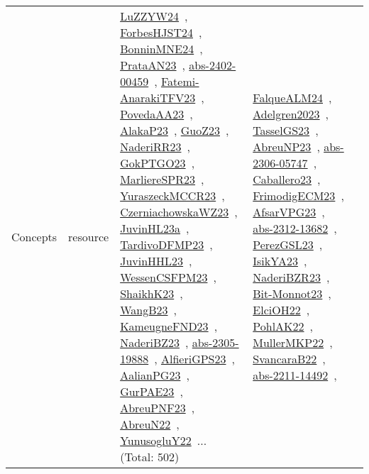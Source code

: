{\begin{longtable}{lp{3cm}>{\raggedright\arraybackslash}p{6cm}>{\raggedright\arraybackslash}p{6cm}>{\raggedright\arraybackslash}p{8cm}}
\index{resource}\index{Concepts!resource}Concepts & resource & \href{../works/LuZZYW24.pdf}{LuZZYW24}~\cite{LuZZYW24}, \href{../works/ForbesHJST24.pdf}{ForbesHJST24}~\cite{ForbesHJST24}, \href{../works/BonninMNE24.pdf}{BonninMNE24}~\cite{BonninMNE24}, \href{../works/PrataAN23.pdf}{PrataAN23}~\cite{PrataAN23}, \href{../works/abs-2402-00459.pdf}{abs-2402-00459}~\cite{abs-2402-00459}, \href{../works/Fatemi-AnarakiTFV23.pdf}{Fatemi-AnarakiTFV23}~\cite{Fatemi-AnarakiTFV23}, \href{../works/PovedaAA23.pdf}{PovedaAA23}~\cite{PovedaAA23}, \href{../works/AlakaP23.pdf}{AlakaP23}~\cite{AlakaP23}, \href{../works/GuoZ23.pdf}{GuoZ23}~\cite{GuoZ23}, \href{../works/NaderiRR23.pdf}{NaderiRR23}~\cite{NaderiRR23}, \href{../works/GokPTGO23.pdf}{GokPTGO23}~\cite{GokPTGO23}, \href{../works/MarliereSPR23.pdf}{MarliereSPR23}~\cite{MarliereSPR23}, \href{../works/YuraszeckMCCR23.pdf}{YuraszeckMCCR23}~\cite{YuraszeckMCCR23}, \href{../works/CzerniachowskaWZ23.pdf}{CzerniachowskaWZ23}~\cite{CzerniachowskaWZ23}, \href{../works/JuvinHL23a.pdf}{JuvinHL23a}~\cite{JuvinHL23a}, \href{../works/TardivoDFMP23.pdf}{TardivoDFMP23}~\cite{TardivoDFMP23}, \href{../works/JuvinHHL23.pdf}{JuvinHHL23}~\cite{JuvinHHL23}, \href{../works/WessenCSFPM23.pdf}{WessenCSFPM23}~\cite{WessenCSFPM23}, \href{../works/ShaikhK23.pdf}{ShaikhK23}~\cite{ShaikhK23}, \href{../works/WangB23.pdf}{WangB23}~\cite{WangB23}, \href{../works/KameugneFND23.pdf}{KameugneFND23}~\cite{KameugneFND23}, \href{../works/NaderiBZ23.pdf}{NaderiBZ23}~\cite{NaderiBZ23}, \href{../works/abs-2305-19888.pdf}{abs-2305-19888}~\cite{abs-2305-19888}, \href{../works/AlfieriGPS23.pdf}{AlfieriGPS23}~\cite{AlfieriGPS23}, \href{../works/AalianPG23.pdf}{AalianPG23}~\cite{AalianPG23}, \href{../works/GurPAE23.pdf}{GurPAE23}~\cite{GurPAE23}, \href{../works/AbreuPNF23.pdf}{AbreuPNF23}~\cite{AbreuPNF23}, \href{../works/AbreuN22.pdf}{AbreuN22}~\cite{AbreuN22}, \href{../works/YunusogluY22.pdf}{YunusogluY22}~\cite{YunusogluY22}... (Total: 502) & \href{../works/FalqueALM24.pdf}{FalqueALM24}~\cite{FalqueALM24}, \href{../works/Adelgren2023.pdf}{Adelgren2023}~\cite{Adelgren2023}, \href{../works/TasselGS23.pdf}{TasselGS23}~\cite{TasselGS23}, \href{../works/AbreuNP23.pdf}{AbreuNP23}~\cite{AbreuNP23}, \href{../works/abs-2306-05747.pdf}{abs-2306-05747}~\cite{abs-2306-05747}, \href{../works/Caballero23.pdf}{Caballero23}~\cite{Caballero23}, \href{../works/FrimodigECM23.pdf}{FrimodigECM23}~\cite{FrimodigECM23}, \href{../works/AfsarVPG23.pdf}{AfsarVPG23}~\cite{AfsarVPG23}, \href{../works/abs-2312-13682.pdf}{abs-2312-13682}~\cite{abs-2312-13682}, \href{../works/PerezGSL23.pdf}{PerezGSL23}~\cite{PerezGSL23}, \href{../works/IsikYA23.pdf}{IsikYA23}~\cite{IsikYA23}, \href{../works/NaderiBZR23.pdf}{NaderiBZR23}~\cite{NaderiBZR23}, \href{../works/Bit-Monnot23.pdf}{Bit-Monnot23}~\cite{Bit-Monnot23}, \href{../works/ElciOH22.pdf}{ElciOH22}~\cite{ElciOH22}, \href{../works/PohlAK22.pdf}{PohlAK22}~\cite{PohlAK22}, \href{../works/MullerMKP22.pdf}{MullerMKP22}~\cite{MullerMKP22}, \href{../works/SvancaraB22.pdf}{SvancaraB22}~\cite{SvancaraB22}, \href{../works/abs-2211-14492.pdf}{abs-2211-14492}~\cite{abs-2211-14492}, 
\end{longtable}}
